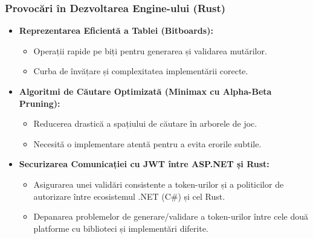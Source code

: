 \documentclass{beamer}
\begin{document}
\begin{frame}
    \frametitle{Provocări în Dezvoltarea Engine-ului (Rust)}
    \begin{itemize}
        \item \textbf{Reprezentarea Eficientă a Tablei (Bitboards):}
        \begin{itemize}
            \item Operații rapide pe biți pentru generarea și validarea mutărilor.
            \item Curba de învățare și complexitatea implementării corecte.
        \end{itemize}
        \item \textbf{Algoritmi de Căutare Optimizată (Minimax cu Alpha-Beta Pruning):}
        \begin{itemize}
            \item Reducerea drastică a spațiului de căutare în arborele de joc.
            \item Necesită o implementare atentă pentru a evita erorile subtile.
        \end{itemize}
        \item \textbf{Securizarea Comunicației cu JWT între ASP.NET și Rust:}
        \begin{itemize}
            \item Asigurarea unei validări consistente a token-urilor și a politicilor de autorizare între ecosistemul .NET (C\#) și cel Rust.
            \item Depanarea problemelor de generare/validare a token-urilor între cele două platforme cu biblioteci și implementări diferite.
        \end{itemize}
    \end{itemize}
\end{frame}
\end{document}
